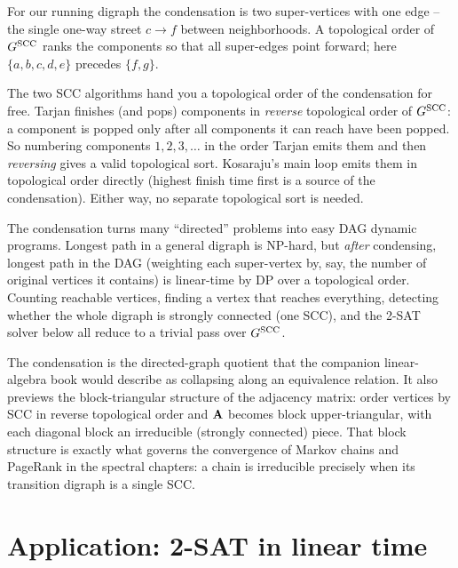 For our running digraph the condensation is two super-vertices with one edge -- the single one-way street $c\to f$ between neighborhoods. A topological order of $G^{\mathrm{SCC}}$ ranks the components so that all super-edges point forward; here $\{a,b,c,d,e\}$ precedes $\{f,g\}$.

\begin{whybox}
The two SCC algorithms hand you a topological order of the condensation for free. Tarjan finishes (and pops) components in \emph{reverse} topological order of $G^{\mathrm{SCC}}$: a component is popped only after all components it can reach have been popped. So numbering components $1,2,3,\dots$ in the order Tarjan emits them and then \emph{reversing} gives a valid topological sort. Kosaraju's main loop emits them in topological order directly (highest finish time first is a source of the condensation). Either way, no separate topological sort is needed.
\end{whybox}

\begin{applicationbox}
The condensation turns many ``directed'' problems into easy DAG dynamic programs. Longest path in a general digraph is NP-hard, but \emph{after} condensing, longest path in the DAG (weighting each super-vertex by, say, the number of original vertices it contains) is linear-time by DP over a topological order. Counting reachable vertices, finding a vertex that reaches everything, detecting whether the whole digraph is strongly connected (one SCC), and the 2-SAT solver below all reduce to a trivial pass over $G^{\mathrm{SCC}}$.
\end{applicationbox}

\begin{connectionbox}
The condensation is the directed-graph quotient that the companion linear-algebra book would describe as collapsing along an equivalence relation. It also previews the block-triangular structure of the adjacency matrix: order vertices by SCC in reverse topological order and $\mathbf{A}$ becomes block upper-triangular, with each diagonal block an irreducible (strongly connected) piece. That block structure is exactly what governs the convergence of Markov chains and PageRank in the spectral chapters: a chain is irreducible precisely when its transition digraph is a single SCC.
\end{connectionbox}

\section{Application: 2-SAT in linear time}
\label{ch05:2sat}

